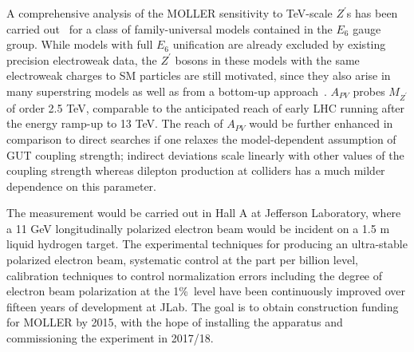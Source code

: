 A comprehensive analysis of the MOLLER sensitivity to 
TeV-scale $Z^\prime$s has been carried out~\cite{ref:cl:Erler:2011iw} 
for a class of family-universal models
contained in the $E_6$ gauge group.  While models with full $E_6$ unification are already
excluded by existing precision electroweak data, the $Z^\prime$ bosons in these models with the same electroweak charges to SM particles are still motivated, since 
they also arise in many superstring models as well as from a bottom-up approach~\cite{ref:cl:Erler:2000wu}. 
$A_{PV}$ probes
 $M_{Z^\prime} $ of order 2.5 TeV, comparable to the anticipated reach of 
early LHC running after the energy ramp-up to 13 TeV. The reach of $A_{PV}$ would be further 
enhanced in comparison 
to direct searches if one relaxes the model-dependent assumption of GUT coupling strength; indirect 
deviations scale linearly with other values of the coupling strength whereas dilepton production at colliders
has a much milder dependence on this parameter. 


The measurement would be carried out in Hall A at Jefferson Laboratory, where a 11 GeV longitudinally polarized electron beam would be incident on a 1.5 m liquid hydrogen target.
The experimental techniques for producing an ultra-stable polarized electron beam, systematic
control at the part per billion level, calibration techniques to control normalization errors including the degree of electron 
beam polarization at the 1\%\ level have been continuously improved over fifteen years of development at JLab. The goal is to obtain construction funding for MOLLER by 2015, with 
the hope of installing the apparatus and commissioning the experiment in 2017/18.

